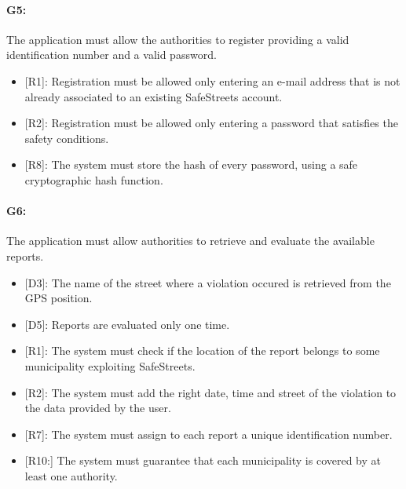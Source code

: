 \documentclass[12pt,a4paper]{report}
\begin{document}
			\paragraph {G5:} The application must allow the authorities to register providing a valid identification number and a valid password.
				\begin{itemize}
					\item{[R1]:} Registration must be allowed only entering an e-mail address that is not already associated to an existing SafeStreets account.
					\item{[R2]:} Registration must be allowed only entering a password that satisfies the safety conditions.
					\item{[R8]:} The system must store the hash of every password, using a safe cryptographic hash function.
				\end{itemize}
			\paragraph {G6:} The application must allow authorities to retrieve and evaluate the available reports.
				\begin{itemize}
					\item{[D3]:} The name of the street where a violation occured is retrieved from the GPS position.
					\item{[D5]:} Reports are evaluated only one time.
				\end{itemize}
				\begin{itemize}
					\item{[R1]:} The system must check if the location of the report belongs to some municipality exploiting SafeStreets.
					\item{[R2]:} The system must add the right date, time and street of the violation to the data provided by the user.
					\item{[R7]:} The system must assign to each report a unique identification number.
					\item{[R10:]} The system must guarantee that each municipality is covered by at least one authority.
				\end{itemize}
\end{document}
